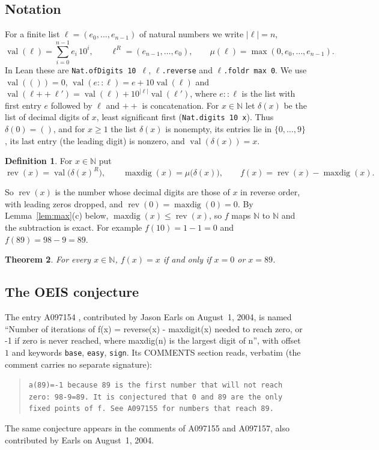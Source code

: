 \documentclass[11pt]{amsart}
\theoremstyle{plain}
\newtheorem{theorem}{Theorem}
\theoremstyle{definition}
\newtheorem{definition}[theorem]{Definition}
\newcommand{\N}{\mathbb{N}}
\newcommand{\rev}{\operatorname{rev}}
\newcommand{\maxdig}{\operatorname{maxdig}}
\newcommand{\val}{\operatorname{val}}
\begin{document}
\subsection*{Notation}
For a finite list $\ell=(e_0,\dots,e_{n-1})$ of natural numbers we write $|\ell|=n$,
\[
  \val(\ell)=\sum_{i=0}^{n-1}e_i\,10^i,\qquad \ell^R=(e_{n-1},\dots,e_0),\qquad \mu(\ell)=\max(0,e_0,\dots,e_{n-1}).
\]
In Lean these are \texttt{Nat.ofDigits 10 $\ell$}, \texttt{$\ell$.reverse} and \texttt{$\ell$.foldr max 0}. We use $\val(())=0$, $\val(e::\ell)=e+10\val(\ell)$ and $\val(\ell\mathbin{+\!\!+}\ell')=\val(\ell)+10^{|\ell|}\val(\ell')$, where $e::\ell$ is the list with first entry $e$ followed by $\ell$ and $\mathbin{+\!\!+}$ is concatenation.
For $x\in\N$ let $\delta(x)$ be the list of decimal digits of $x$, least significant first (\texttt{Nat.digits 10 x}). Thus $\delta(0)=()$, and for $x\ge1$ the list $\delta(x)$ is nonempty, its entries lie in $\{0,\dots,9\}$, its last entry (the leading digit) is nonzero, and $\val(\delta(x))=x$.

\begin{definition}\label{def:f}
For $x\in\N$ put
\[
  \rev(x)=\val\bigl(\delta(x)^R\bigr),\qquad \maxdig(x)=\mu\bigl(\delta(x)\bigr),\qquad f(x)=\rev(x)-\maxdig(x).
\]
\end{definition}

So $\rev(x)$ is the number whose decimal digits are those of $x$ in reverse order, with leading zeros dropped, and $\rev(0)=\maxdig(0)=0$. By Lemma~\ref{lem:max}(c) below, $\maxdig(x)\le\rev(x)$, so $f$ maps $\N$ to $\N$ and the subtraction is exact. For example $f(10)=1-1=0$ and $f(89)=98-9=89$.

\begin{theorem}\label{thm:main}
For every $x\in\N$, $f(x)=x$ if and only if $x=0$ or $x=89$.
\end{theorem}

\subsection*{The OEIS conjecture}
The entry A097154 \cite{A097154}, contributed by Jason Earls on August~1, 2004, is named ``Number of iterations of f(x) = reverse(x) - maxdigit(x) needed to reach zero, or -1 if zero is never reached, where maxdig(n) is the largest digit of n'', with offset $1$ and keywords \texttt{base}, \texttt{easy}, \texttt{sign}. Its COMMENTS section reads, verbatim (the comment carries no separate signature):
\begin{quote}
{\small\raggedright\texttt{a(89)=-1 because 89 is the first number that will not reach zero: 98-9=89. It is conjectured that 0 and 89 are the only fixed points of f. See A097155 for numbers that reach 89.}\par}
\end{quote}
The same conjecture appears in the comments of A097155 and A097157, also contributed by Earls on August~1, 2004.
\end{document}
